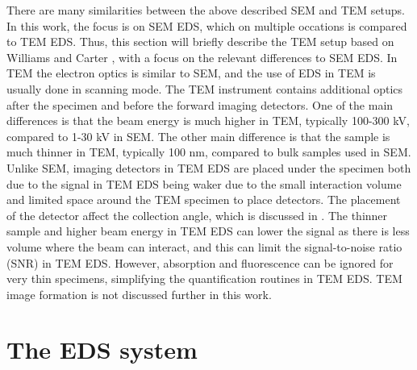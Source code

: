 There are many similarities between the above described SEM and TEM setups.
In this work, the focus is on SEM EDS, which on multiple occations is compared to TEM EDS.
Thus, this section will briefly describe the TEM setup based on Williams and Carter \cite{williams_carter_tem_2009}, with a focus on the relevant differences to SEM EDS.
In TEM the electron optics is similar to SEM, and the use of EDS in TEM is usually done in scanning mode.
The TEM instrument contains additional optics after the specimen and before the forward imaging detectors.
One of the main differences is that the beam energy is much higher in TEM, typically 100-300 kV, compared to 1-30 kV in SEM.
The other main difference is that the sample is much thinner in TEM, typically 100 nm, compared to bulk samples used in SEM.
Unlike SEM, imaging detectors in TEM EDS are placed under the specimen both due to the signal in TEM EDS being waker due to the small interaction volume and limited space around the TEM specimen to place detectors.
The placement of the detector affect the collection angle, which is discussed in .
The thinner sample and higher beam energy in TEM EDS can lower the signal as there is less volume where the beam can interact, and this can limit the signal-to-noise ratio (SNR) in TEM EDS.
However, absorption and fluorescence can be ignored for very thin specimens, simplifying the quantification routines in TEM EDS.
TEM image formation is not discussed further in this work.












\clearpage


\section{The EDS system}
\label{theory:eds}





